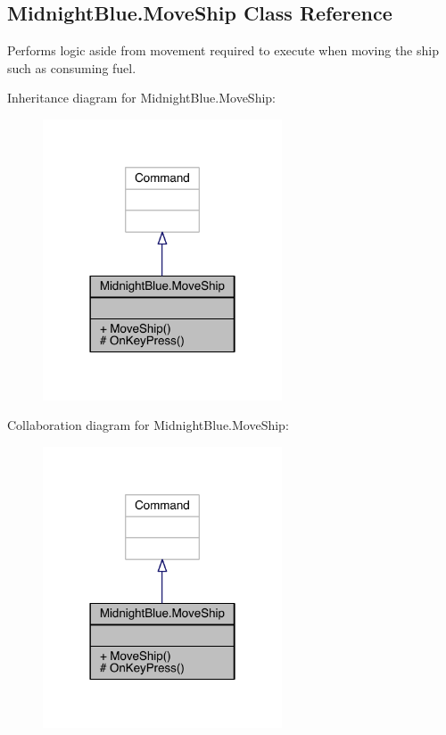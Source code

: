 \hypertarget{class_midnight_blue_1_1_move_ship}{}\subsection{Midnight\+Blue.\+Move\+Ship Class Reference}
\label{class_midnight_blue_1_1_move_ship}


Performs logic aside from movement required to execute when moving the ship such as consuming fuel.  




Inheritance diagram for Midnight\+Blue.\+Move\+Ship\+:\nopagebreak
\begin{figure}[H]
\begin{center}
\leavevmode
\includegraphics[width=201pt]{class_midnight_blue_1_1_move_ship__inherit__graph}
\end{center}
\end{figure}


Collaboration diagram for Midnight\+Blue.\+Move\+Ship\+:\nopagebreak
\begin{figure}[H]
\begin{center}
\leavevmode
\includegraphics[width=201pt]{class_midnight_blue_1_1_move_ship__coll__graph}
\end{center}
\end{figure}
